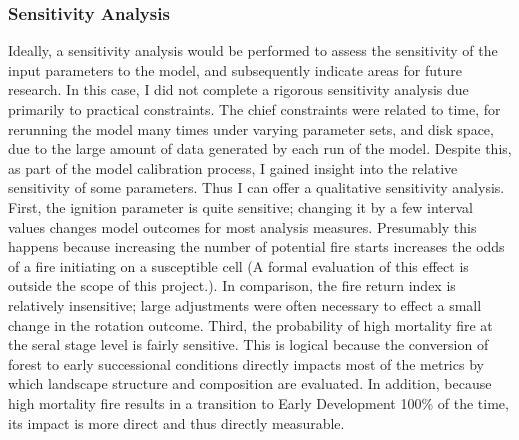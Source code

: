 \subsubsection*{Sensitivity Analysis} Ideally, a sensitivity analysis would be performed to assess the sensitivity of the input parameters to the model, and subsequently indicate areas for future research. In this case, I did not complete a rigorous sensitivity analysis due primarily to practical constraints. The chief constraints were related to time, for rerunning the model many times under varying parameter sets, and disk space, due to the large amount of data generated by each run of the model. Despite this, as part of the model calibration process, I gained insight into the relative sensitivity of some parameters. Thus I can offer a qualitative sensitivity analysis. First, the ignition parameter is quite sensitive; changing it by a few interval values changes model outcomes for most analysis measures. Presumably this happens because increasing the number of potential fire starts increases the odds of a fire initiating on a susceptible cell (A formal evaluation of this effect is outside the scope of this project.). In comparison, the fire return index is relatively insensitive; large adjustments were often necessary to effect a small change in the rotation outcome. Third, the probability of high mortality fire at the seral stage level is fairly sensitive. This is logical because the conversion of forest to early successional conditions directly impacts most of the metrics by which landscape structure and composition are evaluated. In addition, because high mortality fire results in a transition to Early Development 100\% of the time, its impact is more direct and thus directly measurable.

